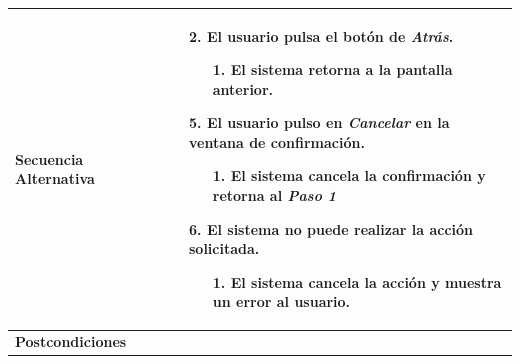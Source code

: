 \begin{longtable}{| p{4cm} | p{10cm} |}
\\
\hline
\textbf{Secuencia Alternativa} &\mbox{}\par\vspace{-\baselineskip}
\begin{enumerate}[leftmargin=0.9cm, topsep=0.1cm]
\item[2.] El usuario pulsa el botón de \textit{Atrás}.
	\begin{itemize}
	\item[1.] El sistema retorna a la pantalla anterior.
	\end{itemize}
\item[5.] El usuario pulso en \textit{Cancelar} en la ventana de confirmación.
	\begin{itemize}
	\item[1.] El sistema cancela la confirmación y retorna al \textit{Paso 1}
	\end{itemize}
\item[6.] El sistema no puede realizar la acción solicitada.
	\begin{itemize}
	\item[1.] El sistema cancela la acción y muestra un error al usuario.
	\end{itemize}
\end{enumerate}
\\

\hline
\textbf{Postcondiciones} & \\
\hline
\end{longtable}



\newpage
